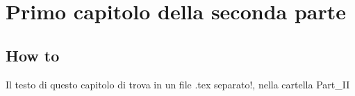 \chapter{Primo capitolo della seconda parte}

\section{How to}
Il testo di questo capitolo di trova in un file .tex separato!, nella cartella Part\_II

\lipsum[1]